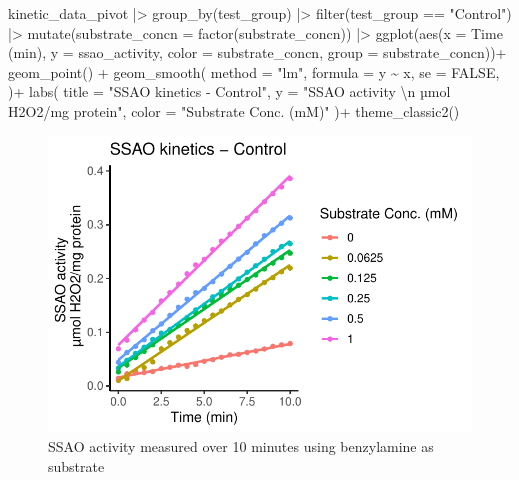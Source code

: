 \documentclass[
  letterpaper,
  DIV=11,
  numbers=noendperiod]{scrreprt}
\newenvironment{Shaded}{\begin{snugshade}}{\end{snugshade}}
\newcommand{\AttributeTok}[1]{\textcolor[rgb]{0.40,0.45,0.13}{#1}}
\newcommand{\ConstantTok}[1]{\textcolor[rgb]{0.56,0.35,0.01}{#1}}
\newcommand{\FunctionTok}[1]{\textcolor[rgb]{0.28,0.35,0.67}{#1}}
\newcommand{\NormalTok}[1]{\textcolor[rgb]{0.00,0.23,0.31}{#1}}
\newcommand{\SpecialCharTok}[1]{\textcolor[rgb]{0.37,0.37,0.37}{#1}}
\newcommand{\StringTok}[1]{\textcolor[rgb]{0.13,0.47,0.30}{#1}}
\begin{document}
\begin{Shaded}
\begin{Highlighting}[]
\NormalTok{kinetic\_data\_pivot }\SpecialCharTok{|\textgreater{}} 
  \FunctionTok{group\_by}\NormalTok{(test\_group) }\SpecialCharTok{|\textgreater{}} 
  \FunctionTok{filter}\NormalTok{(test\_group }\SpecialCharTok{==} \StringTok{"Control"}\NormalTok{) }\SpecialCharTok{|\textgreater{}} \FunctionTok{mutate}\NormalTok{(}\AttributeTok{substrate\_concn =} \FunctionTok{factor}\NormalTok{(substrate\_concn)) }\SpecialCharTok{|\textgreater{}} 
  \FunctionTok{ggplot}\NormalTok{(}\FunctionTok{aes}\NormalTok{(}\AttributeTok{x =} \StringTok{\textasciigrave{}}\AttributeTok{Time (min)}\StringTok{\textasciigrave{}}\NormalTok{, }
             \AttributeTok{y =}\NormalTok{ ssao\_activity, }
             \AttributeTok{color =}\NormalTok{ substrate\_concn, }
             \AttributeTok{group =}\NormalTok{ substrate\_concn))}\SpecialCharTok{+} 
  \FunctionTok{geom\_point}\NormalTok{() }\SpecialCharTok{+} 
  \FunctionTok{geom\_smooth}\NormalTok{(}
    \AttributeTok{method =} \StringTok{"lm"}\NormalTok{,}
    \AttributeTok{formula =}\NormalTok{ y }\SpecialCharTok{\textasciitilde{}}\NormalTok{ x,}
    \AttributeTok{se =} \ConstantTok{FALSE}\NormalTok{,}
\NormalTok{    )}\SpecialCharTok{+}
  \FunctionTok{labs}\NormalTok{(}
    \AttributeTok{title =} \StringTok{"SSAO kinetics {-} Control"}\NormalTok{,}
    \AttributeTok{y =} \StringTok{"SSAO activity }\SpecialCharTok{\textbackslash{}n}\StringTok{ µmol H2O2/mg protein"}\NormalTok{, }\AttributeTok{color =} \StringTok{"Substrate Conc. (mM)"}
\NormalTok{  )}\SpecialCharTok{+} \FunctionTok{theme\_classic2}\NormalTok{()}
\end{Highlighting}
\end{Shaded}

\begin{figure}[H]

{\centering \includegraphics{results_files/figure-pdf/fig - ssao_activity_control-1.pdf}

}

\caption{SSAO activity measured over 10 minutes using benzylamine as
substrate}

\end{figure}%
\end{document}

